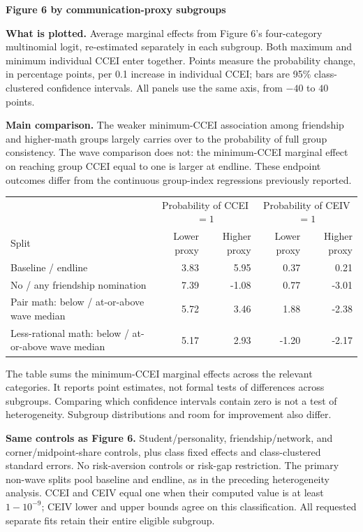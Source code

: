 \documentclass[11pt]{article}
\begin{document}
\begin{center}\Large\textbf{Figure 6 by communication-proxy subgroups}\end{center}
\textbf{What is plotted.} Average marginal effects from Figure 6's four-category multinomial logit,
re-estimated separately in each subgroup. Both maximum and minimum individual CCEI enter together.
Points measure the probability change, in percentage points, per 0.1 increase in individual CCEI;
bars are 95\% class-clustered confidence intervals. All panels use the same axis, from $-40$ to $40$ points.

\textbf{Main comparison.} The weaker minimum-CCEI association among friendship and higher-math groups
largely carries over to the probability of full group consistency. The wave comparison does not:
the minimum-CCEI marginal effect on reaching group CCEI equal to one is larger at endline.
These endpoint outcomes differ from the continuous group-index regressions previously reported.

\begin{center}\small
\begin{tabular}{lrrrr}\toprule
& \multicolumn{2}{c}{Probability of CCEI $=1$} & \multicolumn{2}{c}{Probability of CEIV $=1$}\\
Split & Lower proxy & Higher proxy & Lower proxy & Higher proxy\\\midrule
Baseline / endline & 3.83 & 5.95 & 0.37 & 0.21\\
No / any friendship nomination & 7.39 & -1.08 & 0.77 & -3.01\\
Pair math: below / at-or-above wave median & 5.72 & 3.46 & 1.88 & -2.38\\
Less-rational math: below / at-or-above wave median & 5.17 & 2.93 & -1.20 & -2.17\\
\bottomrule\end{tabular}\end{center}
\small
The table sums the minimum-CCEI marginal effects across the relevant categories. It reports point estimates,
not formal tests of differences across subgroups. Comparing which confidence intervals contain zero is not a test
of heterogeneity. Subgroup distributions and room for improvement also differ.

\textbf{Same controls as Figure 6.} Student/personality, friendship/network, and corner/midpoint-share controls,
plus class fixed effects and class-clustered standard errors. No risk-aversion controls or risk-gap restriction.
The primary non-wave splits pool baseline and endline, as in the preceding heterogeneity analysis.
CCEI and CEIV equal one when their computed value is at least $1-10^{-9}$; CEIV lower and upper bounds agree
on this classification. All requested separate fits retain their entire eligible subgroup.
\end{document}
